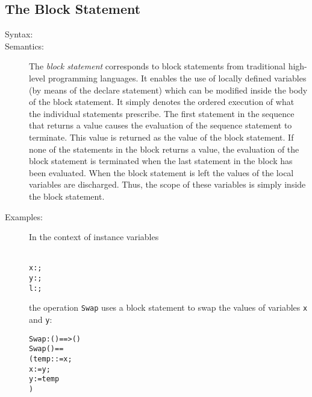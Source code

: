 \documentclass[\pformat,12pt]{article}
\begin{document}
\subsection{The Block Statement} \label{dcl-stmt}

\begin{description}
\item[Syntax:]




\item[Semantics:] The {\it block statement} corresponds to block statements
  from traditional high-level programming languages.  It enables the use of
  locally defined variables (by means of the declare statement) which can
  be modified inside the body of the block statement. It simply denotes the
  ordered execution of what the individual statements prescribe. The first
  statement in the sequence that returns a value causes the evaluation of
  the sequence statement to terminate. This value is returned as the
  value of the block statement. If none of the statements in the block
  returns a value, the evaluation of the block statement is terminated when
  the last statement in the block has been evaluated. When the block
  statement is left the values of the local variables are discharged. Thus,
  the scope of these variables is simply inside the block statement.
      
\item[Examples:] In the context of 
instance variables
  \begin{alltt}\label{stdef}
    x:;
    y:;
    l:;
  \end{alltt}
  the operation \texttt{Swap} uses a block statement to swap the values of 
  variables \texttt{x} and \texttt{y}:
  \begin{alltt}
  Swap : () ==> ()
  Swap () ==
    ( temp:  := x;
     x := y;
     y := temp
    )
  \end{alltt}

\end{description}
\end{document}
